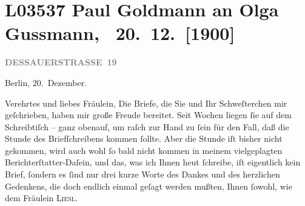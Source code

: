 

\section[ Paul Goldmann an Olga Gussmann, 20. 12. {[}1900{]}]{L03537 Paul Goldmann an Olga Gussmann,  20. 12. {[}1900{]}}
\nopagebreak{}
\rehead{ }\normalsize\beginnumbering{}
\toendnotes[C]{\smallbreak\pagebreak[2]}
\toendnotes[C]{\smallbreak}
\toendnotes[C]{\smallbreak}
\pstart
           \raggedleft{}{\pb}\textcolor{gray}{\textbf{DESSAUERSTRASSE 19}}\pend
           
\pstart
           Berlin, 20. Dezember.\pend
           
\pstart\center{}Verehrtes und liebes Fräulein,\pend\vspace{0.5em}
\pstart
           Die Briefe, die Sie und Ihr Schweſterchen mir geſchrieben, haben mir  große Freude bereitet. Seit Wochen liegen{ }ſie auf dem Schreibtiſch – ganz
               obenauf, um raſch zur Hand zu{ }ſein für den Fall, daß die Stunde des Briefſchreibens
               kommen{ }ſollte. Aber die Stunde iſt bisher nicht gekommen, wird auch wohl{ }ſo bald
               nicht kommen in meinem vielgeplagten Berichterſtatter-Daſein, und das, was ich Ihnen
                  heut{ }ſchreibe, iſt eigentlich kein Brief,{ }ſondern
               es{ }ſind nur drei kurze Worte des Dankes und des herzlichen Gedenkens, die doch
               endlich einmal geſagt werden mußten, Ihnen {\pb}ſowohl,
               wie dem Fräulein \textsc{Liesl}.\pend
           
